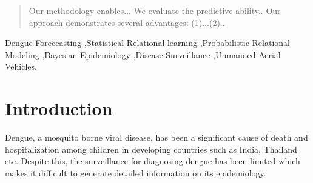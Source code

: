 \documentclass[review]{elsarticle}
\begin{document}
\begin{frontmatter}
\begin{abstract}
Our methodology enables...
We evaluate the predictive ability..
Our approach demonstrates several advantages: (1)...(2)..







\end{abstract}

\begin{keyword}
Dengue Foreccasting \sep Statistical Relational learning \sep Probabilistic Relational Modeling \sep Bayesian Epidemiology \sep Disease Surveillance \sep Unmanned Aerial Vehicles. 
\end{keyword}

\end{frontmatter}

\linenumbers

\section{Introduction}

Dengue, a mosquito borne viral disease, has been a significant cause of death and hospitalization among children in developing countries such as India, Thailand etc. Despite this, the surveillance for diagnosing dengue has been limited which makes it difficult to generate detailed information on its epidemiology.
\end{document}
